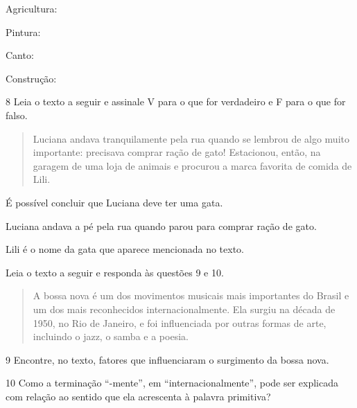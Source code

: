 \begin{escolha}
\item Agricultura: 

\item Pintura: 

\item Canto: 

\item Construção: 
\end{escolha}

\num{8} Leia o texto a seguir e assinale V para o que for verdadeiro e F para o que for falso.

\begin{quote}
Luciana andava tranquilamente pela rua quando se lembrou de algo muito
importante: precisava comprar ração de gato! Estacionou, então, na
garagem de uma loja de animais e procurou a marca favorita de comida de
Lili.
\end{quote}

\begin{boxlist}
 É possível concluir que Luciana deve ter uma gata.

 Luciana andava a pé pela rua quando parou para comprar ração de gato.

 Lili é o nome da gata que aparece mencionada no texto.
\end{boxlist}


Leia o texto a seguir e responda às questões 9 e 10.

\begin{quote}
A bossa nova é um dos movimentos musicais mais importantes do Brasil e
um dos mais reconhecidos internacionalmente. Ela surgiu na década de
1950, no Rio de Janeiro, e foi influenciada por outras formas de arte,
incluindo o jazz, o samba e a poesia.
\end{quote}

\num{9} Encontre, no texto, fatores que influenciaram o surgimento da bossa nova.



\num{10} Como a terminação “-mente”, em “internacionalmente”, pode ser explicada com relação ao sentido que ela acrescenta à palavra primitiva?


